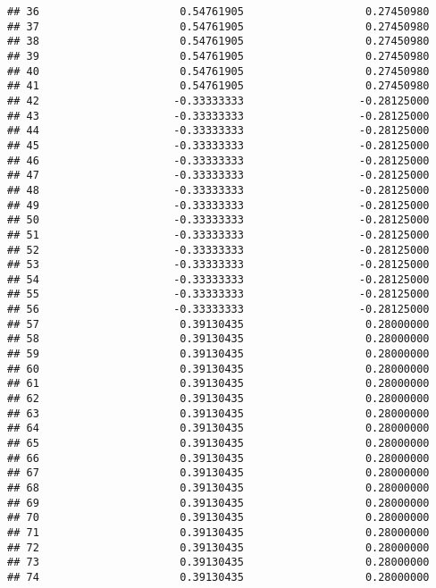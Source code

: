 \documentclass[]{article}
\begin{document}
\begin{verbatim}
## 36                      0.54761905                   0.27450980
## 37                      0.54761905                   0.27450980
## 38                      0.54761905                   0.27450980
## 39                      0.54761905                   0.27450980
## 40                      0.54761905                   0.27450980
## 41                      0.54761905                   0.27450980
## 42                     -0.33333333                  -0.28125000
## 43                     -0.33333333                  -0.28125000
## 44                     -0.33333333                  -0.28125000
## 45                     -0.33333333                  -0.28125000
## 46                     -0.33333333                  -0.28125000
## 47                     -0.33333333                  -0.28125000
## 48                     -0.33333333                  -0.28125000
## 49                     -0.33333333                  -0.28125000
## 50                     -0.33333333                  -0.28125000
## 51                     -0.33333333                  -0.28125000
## 52                     -0.33333333                  -0.28125000
## 53                     -0.33333333                  -0.28125000
## 54                     -0.33333333                  -0.28125000
## 55                     -0.33333333                  -0.28125000
## 56                     -0.33333333                  -0.28125000
## 57                      0.39130435                   0.28000000
## 58                      0.39130435                   0.28000000
## 59                      0.39130435                   0.28000000
## 60                      0.39130435                   0.28000000
## 61                      0.39130435                   0.28000000
## 62                      0.39130435                   0.28000000
## 63                      0.39130435                   0.28000000
## 64                      0.39130435                   0.28000000
## 65                      0.39130435                   0.28000000
## 66                      0.39130435                   0.28000000
## 67                      0.39130435                   0.28000000
## 68                      0.39130435                   0.28000000
## 69                      0.39130435                   0.28000000
## 70                      0.39130435                   0.28000000
## 71                      0.39130435                   0.28000000
## 72                      0.39130435                   0.28000000
## 73                      0.39130435                   0.28000000
## 74                      0.39130435                   0.28000000

\end{verbatim}
\end{document}
